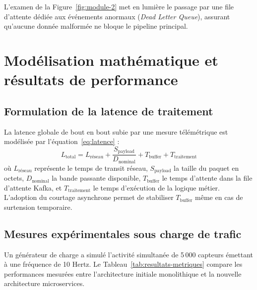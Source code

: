 L'examen de la Figure~\ref{fig:module-2} met en lumi\`ere le passage par une file d'attente d\'edi\'ee aux \'ev\'enements anormaux (\textit{Dead Letter Queue}), assurant qu'aucune donn\'ee malform\'ee ne bloque le pipeline principal.

\section{Mod\'elisation math\'ematique et r\'esultats de performance}
\subsection{Formulation de la latence de traitement}
La latence globale de bout en bout subie par une mesure t\'el\'em\'etrique est mod\'elis\'ee par l'\'equation~\eqref{eq:latence} :
\begin{equation}
L_{\text{total}} = L_{\text{r\'eseau}} + \frac{S_{\text{payload}}}{D_{\text{nominal}}} + T_{\text{buffer}} + T_{\text{traitement}}
\label{eq:latence}
\end{equation}
o\`u $L_{\text{r\'eseau}}$ repr\'esente le temps de transit r\'eseau, $S_{\text{payload}}$ la taille du paquet en octets, $D_{\text{nominal}}$ la bande passante disponible, $T_{\text{buffer}}$ le temps d'attente dans la file d'attente Kafka, et $T_{\text{traitement}}$ le temps d'ex\'ecution de la logique m\'etier. L'adoption du courtage asynchrone permet de stabiliser $T_{\text{buffer}}$ m\^eme en cas de surtension temporaire.

\subsection{Mesures exp\'erimentales sous charge de trafic}
Un g\'en\'erateur de charge a simul\'e l'activit\'e simultan\'ee de 5\,000 capteurs \'emettant \`a une fr\'equence de 10 Hertz. Le Tableau~\ref{tab:resultats-metriques} compare les performances mesur\'ees entre l'architecture initiale monolithique et la nouvelle architecture microservices.

